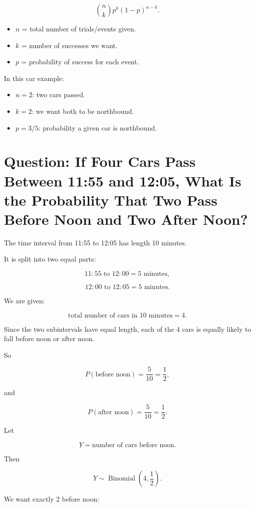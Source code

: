 \documentclass[12pt]{article}
\begin{document}
\[
\binom{n}{k}p^k(1-p)^{n-k}.
\]

\begin{itemize}
    \item \(n\) = total number of trials/events given.
    \item \(k\) = number of successes we want.
    \item \(p\) = probability of success for each event.
\end{itemize}

In this car example:

\begin{itemize}
    \item \(n=2\): two cars passed.
    \item \(k=2\): we want both to be northbound.
    \item \(p=3/5\): probability a given car is northbound.
\end{itemize}

\section{Question: If Four Cars Pass Between 11:55 and 12:05, What Is the Probability That Two Pass Before Noon and Two After Noon?}

The time interval from 11:55 to 12:05 has length 10 minutes.

It is split into two equal parts:

\[
11:55 \text{ to } 12:00 = 5 \text{ minutes},
\]

\[
12:00 \text{ to } 12:05 = 5 \text{ minutes}.
\]

We are given:

\[
\text{total number of cars in 10 minutes}=4.
\]

Since the two subintervals have equal length, each of the 4 cars is equally likely to fall before noon or after noon.

So

\[
P(\text{before noon})=\frac{5}{10}=\frac{1}{2},
\]

and

\[
P(\text{after noon})=\frac{5}{10}=\frac{1}{2}.
\]

Let

\[
Y=\text{number of cars before noon}.
\]

Then

\[
Y\sim \operatorname{Binomial}\left(4,\frac{1}{2}\right).
\]

We want exactly 2 before noon:
\end{document}
